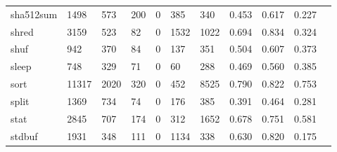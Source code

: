 \begin{longtable}{lp{1.10cm}p{1.10cm}p{1.10cm}p{1.10cm}p{1.10cm}p{1.10cm}p{1.10cm}p{1.10cm}p{1.10cm}p{1.10cm}}
sha512sum &                   1498 &                                573 &                               200 &                                0 &                               385 &                             340 &                          0.453 &                                 0.617 &                               0.227 \\
shred     &                   3159 &                                523 &                                82 &                                0 &                              1532 &                            1022 &                          0.694 &                                 0.834 &                               0.324 \\
shuf      &                    942 &                                370 &                                84 &                                0 &                               137 &                             351 &                          0.504 &                                 0.607 &                               0.373 \\
sleep     &                    748 &                                329 &                                71 &                                0 &                                60 &                             288 &                          0.469 &                                 0.560 &                               0.385 \\
sort      &                  11317 &                               2020 &                               320 &                                0 &                               452 &                            8525 &                          0.790 &                                 0.822 &                               0.753 \\
split     &                   1369 &                                734 &                                74 &                                0 &                               176 &                             385 &                          0.391 &                                 0.464 &                               0.281 \\
stat      &                   2845 &                                707 &                               174 &                                0 &                               312 &                            1652 &                          0.678 &                                 0.751 &                               0.581 \\
stdbuf    &                   1931 &                                348 &                               111 &                                0 &                              1134 &                             338 &                          0.630 &                                 0.820 &                               0.175 \\

\end{longtable}
